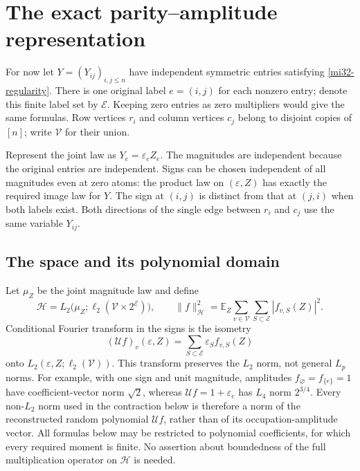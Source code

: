 \documentclass[11pt]{article}
\theoremstyle{definition}
\theoremstyle{remark}
\newcommand{\E}{\mathbb E}
\newcommand{\norm}[1]{\lVert#1\rVert}
\begin{document}
\section{The exact parity--amplitude representation}
\label{mi32-representation-section}

For now let $Y=(Y_{ij})_{i,j\le n}$ have independent symmetric entries
satisfying \eqref{mi32-regularity}. There is one original label
$e=(i,j)$ for each nonzero entry; denote this finite label set by
$\mathcal E$. Keeping zero entries as zero multipliers would give the
same formulas. Row vertices $r_i$ and column vertices $c_j$ belong to
disjoint copies of $[n]$; write $\mathcal V$ for their union.

Represent the joint law as $Y_e=\varepsilon_eZ_e$. The magnitudes are
independent because the original entries are independent. Signs can be
chosen independent of all magnitudes even at zero atoms: the product
law on $(\varepsilon,Z)$ has exactly the required image law for $Y$.
The sign at $(i,j)$ is distinct from that at $(j,i)$ when both labels
exist. Both directions of the single edge between $r_i$ and $c_j$
use the same variable $Y_{ij}$.

\subsection{The space and its polynomial domain}

Let $\mu_Z$ be the joint magnitude law and define
\begin{equation}\label{mi32-state-space}
 \mathcal H=L_2\bigl(\mu_Z;
                    \ell_2(\mathcal V\times2^{\mathcal E})\bigr),
 \qquad
 \norm{f}_{\mathcal H}^2
      =\E_Z\sum_{v\in\mathcal V}\sum_{S\subset\mathcal E}
                                                |f_{v,S}(Z)|^2.
\end{equation}
Conditional Fourier transform in the signs is the isometry
\begin{equation}\label{mi32-fourier-transform}
 (\mathcal U f)_v(\varepsilon,Z)
          =\sum_{S\subset\mathcal E}\varepsilon_S f_{v,S}(Z)
\end{equation}
onto $L_2(\varepsilon,Z;\ell_2(\mathcal V))$.
This transform preserves the $L_2$ norm, not general $L_p$ norms.
For example, with one sign and unit magnitude, amplitudes
$f_{\varnothing}=f_{\{e\}}=1$ have coefficient-vector norm $\sqrt2$,
whereas $\mathcal U f=1+\varepsilon_e$ has $L_4$ norm $2^{3/4}$.
Every non-$L_2$ norm used in the contraction below is therefore a norm
of the reconstructed random polynomial $\mathcal U f$, rather than
of its occupation-amplitude vector.
All formulas below may be restricted to polynomial coefficients, for
which every required moment is finite. No assertion about boundedness
of the full multiplication operator on $\mathcal H$ is needed.
\end{document}
